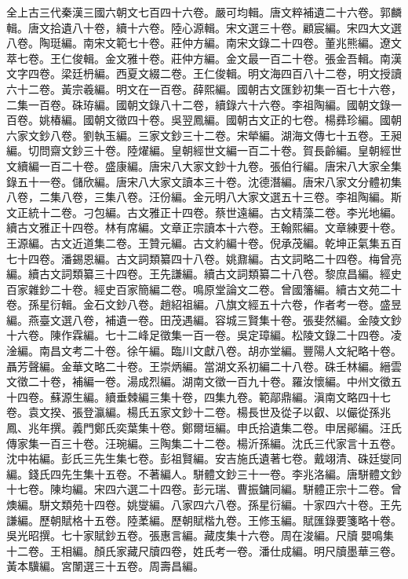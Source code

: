 \begin{pinyinscope}
全上古三代秦漢三國六朝文七百四十六卷。嚴可均輯。唐文粹補遺二十六卷。郭麟輯。唐文拾遺八十卷，續十六卷。陸心源輯。宋文選三十卷。顧宸編。宋四大文選八卷。陶珽編。南宋文範七十卷。莊仲方編。南宋文錄二十四卷。董兆熊編。遼文萃七卷。王仁俊輯。金文雅十卷。莊仲方編。金文最一百二十卷。張金吾輯。南漢文字四卷。梁廷枬編。西夏文綴二卷。王仁俊輯。明文海四百八十二卷，明文授讀六十二卷。黃宗羲編。明文在一百卷。薛熙編。國朝古文匯鈔初集一百七十六卷，二集一百卷。硃珔編。國朝文錄八十二卷，續錄六十六卷。李祖陶編。國朝文錄一百卷。姚椿編。國朝文徵四十卷。吳翌鳳編。國朝古文正的七卷。楊彞珍編。國朝六家文鈔八卷。劉執玉編。三家文鈔三十二卷。宋犖編。湖海文傳七十五卷。王昶編。切問齋文鈔三十卷。陸燿編。皇朝經世文編一百二十卷。賀長齡編。皇朝經世文續編一百二十卷。盛康編。唐宋八大家文鈔十九卷。張伯行編。唐宋八大家全集錄五十一卷。儲欣編。唐宋八大家文讀本三十卷。沈德潛編。唐宋八家文分體初集八卷，二集八卷，三集八卷。汪份編。金元明八大家文選五十三卷。李祖陶編。斯文正統十二卷。刁包編。古文雅正十四卷。蔡世遠編。古文精藻二卷。李光地編。續古文雅正十四卷。林有席編。文章正宗讀本十六卷。王翰熙編。文章練要十卷。王源編。古文近道集二卷。王贊元編。古文約編十卷。倪承茂編。乾坤正氣集五百七十四卷。潘錫恩編。古文詞類纂四十八卷。姚鼐編。古文詞略二十四卷。梅曾亮編。續古文詞類纂三十四卷。王先謙編。續古文詞類纂二十八卷。黎庶昌編。經史百家雜鈔二十卷。經史百家簡編二卷。鳴原堂論文二卷。曾國籓編。續古文苑二十卷。孫星衍輯。金石文鈔八卷。趙紹祖編。八旗文經五十六卷，作者考一卷。盛昱編。燕臺文選八卷，補遺一卷。田茂遇編。容城三賢集十卷。張斐然編。金陵文鈔十六卷。陳作霖編。七十二峰足徵集一百一卷。吳定璋編。松陵文錄二十四卷。凌淦編。南昌文考二十卷。徐午編。臨川文獻八卷。胡亦堂編。豐陽人文紀略十卷。聶芳聲編。金華文略二十卷。王崇炳編。當湖文系初編二十八卷。硃壬林編。縉雲文徵二十卷，補編一卷。湯成烈編。湖南文徵一百九十卷。羅汝懷編。中州文徵五十四卷。蘇源生編。續垂棘編三集十卷，四集九卷。範鄗鼎編。滇南文略四十七卷。袁文揆、張登瀛編。楊氏五家文鈔十二卷。楊長世及從子以叡、以儼從孫兆鳳、兆年撰。義門鄭氏奕葉集十卷。鄭爾垣編。申氏拾遺集二卷。申居鄖編。汪氏傳家集一百三十卷。汪琬編。三陶集二十二卷。楊沂孫編。沈氏三代家言十五卷。沈中祐編。彭氏三先生集七卷。彭祖賢編。安吉施氏遺著七卷。戴翊清、硃廷燮同編。錢氏四先生集十五卷。不著編人。駢體文鈔三十一卷。李兆洛編。唐駢體文鈔十七卷。陳均編。宋四六選二十四卷。彭元瑞、曹振鏞同編。駢體正宗十二卷。曾燠編。駢文類苑十四卷。姚燮編。八家四六八卷。孫星衍編。十家四六十卷。王先謙編。歷朝賦格十五卷。陸葇編。歷朝賦楷九卷。王修玉編。賦匯錄要箋略十卷。吳光昭撰。七十家賦鈔五卷。張惠言編。藏庋集十六卷。周在浚編。尺牘嬰鳴集十二卷。王相編。顏氏家藏尺牘四卷，姓氏考一卷。潘仕成編。明尺牘墨華三卷。黃本驥編。宮闈選三十五卷。周壽昌編。


\end{pinyinscope}
